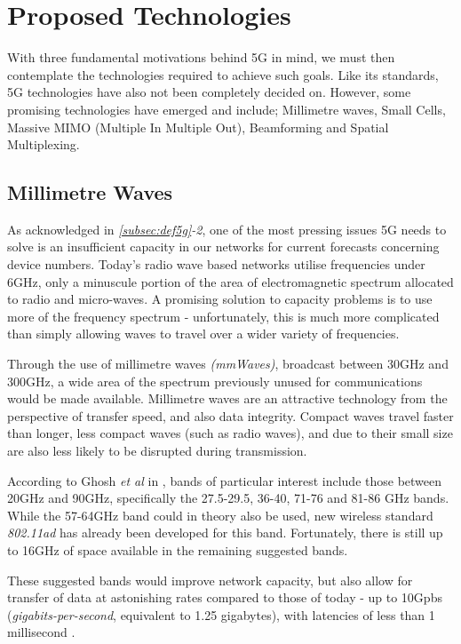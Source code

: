\documentclass[journal]{IEEEtran}
\begin{document}
\section{Proposed Technologies}

With three fundamental motivations behind 5G in mind, we must then contemplate the technologies required to achieve such goals. Like its standards, 5G technologies have also not been completely decided on. However, some promising technologies have emerged and include; Millimetre waves, Small Cells, Massive MIMO (Multiple In Multiple Out), Beamforming and Spatial Multiplexing.

\subsection{Millimetre Waves}
As acknowledged in \textit{\ref{subsec:def5g}-2}, one of the most pressing issues 5G needs to solve is an insufficient capacity in our networks for current forecasts concerning device numbers. Today's radio wave based networks utilise frequencies under 6GHz, only a minuscule portion of the area of electromagnetic spectrum allocated to radio and micro-waves. A promising solution to capacity problems is to use more of the frequency spectrum - unfortunately, this is much more complicated than simply allowing waves to travel over a wider variety of frequencies. 

Through the use of millimetre waves \textit{(mmWaves)}, broadcast between 30GHz and 300GHz, a wide area of the spectrum previously unused for communications would be made available. Millimetre waves are an attractive technology from the perspective of transfer speed, and also data integrity. Compact waves travel faster than longer, less compact waves (such as radio waves), and due to their small size are also less likely to be disrupted during transmission.

According to Ghosh \textit{et al} in \cite{mmwave}, bands of particular interest include those between 20GHz and 90GHz, specifically the 27.5-29.5, 36-40, 71-76 and 81-86 GHz bands. While the 57-64GHz band could in theory also be used, new wireless standard \textit{802.11ad} has already been developed for this band. Fortunately, there is still up to 16GHz of space available in the remaining suggested bands. 

These suggested bands would improve network capacity, but also allow for transfer of data at astonishing rates compared to those of today - up to 10Gpbs (\textit{gigabits-per-second}, equivalent to 1.25 gigabytes), with latencies of less than 1 millisecond \cite{mmwave}. 
\end{document}
